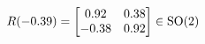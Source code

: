 \documentclass[preview]{standalone}
\begin{document}
\begin{align*}
\special{dvisvgm:raw <g id='unique000'>}R(-0.39) = \begin{bmatrix} 0.92 & 0.38 \\ -0.38 & 0.92 \end{bmatrix} \in \text{SO}(2)\special{dvisvgm:raw </g>}
\end{align*}
\end{document}
